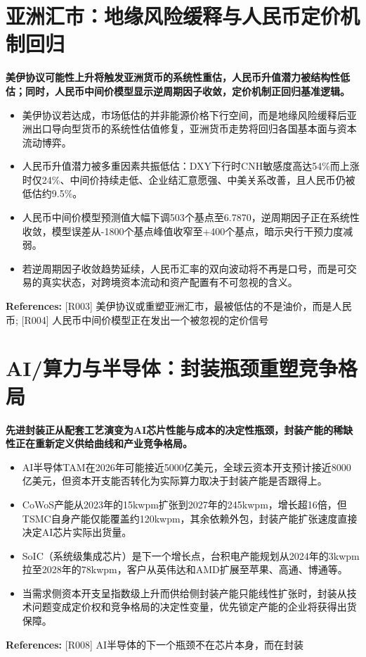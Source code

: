 \documentclass[11pt]{ctexart}
\begin{document}
\section{亚洲汇市：地缘风险缓释与人民币定价机制回归}
\textbf{美伊协议可能性上升将触发亚洲货币的系统性重估，人民币升值潜力被结构性低估；同时，人民币中间价模型显示逆周期因子收敛，定价机制正回归基准逻辑。}

\begin{itemize}
  \item 美伊协议若达成，市场低估的并非能源价格下行空间，而是地缘风险缓释后亚洲出口导向型货币的系统性估值修复，亚洲货币走势将回归各国基本面与资本流动博弈。
  \item 人民币升值潜力被多重因素共振低估：DXY下行时CNH敏感度高达54\%而上涨时仅24\%、中间价持续走低、企业结汇意愿强、中美关系改善，且人民币仍被低估约9.5\%。
  \item 人民币中间价模型预测值大幅下调503个基点至6.7870，逆周期因子正在系统性收敛，模型误差从-1800个基点峰值收窄至+400个基点，暗示央行干预力度减弱。
  \item 若逆周期因子收敛趋势延续，人民币汇率的双向波动将不再是口号，而是可交易的真实状态，对跨境资本流动和资产配置有不可忽视的含义。
\end{itemize}
{\small\color{refgray}\textbf{References:} [R003] 美伊协议或重塑亚洲汇市，最被低估的不是油价，而是人民币; [R004] 人民币中间价模型正在发出一个被忽视的定价信号}

\section{AI/算力与半导体：封装瓶颈重塑竞争格局}
\textbf{先进封装正从配套工艺演变为AI芯片性能与成本的决定性瓶颈，封装产能的稀缺性正在重新定义供给曲线和产业竞争格局。}

\begin{itemize}
  \item AI半导体TAM在2026年可能接近5000亿美元，全球云资本开支预计接近8000亿美元，但资本开支能否转化为实际算力取决于封装产能是否跟得上。
  \item CoWoS产能从2023年的15kwpm扩张到2027年的245kwpm，增长超16倍，但TSMC自身产能仅能覆盖约120kwpm，其余依赖外包，封装产能扩张速度直接决定AI芯片实际出货量。
  \item SoIC（系统级集成芯片）是下一个增长点，台积电产能规划从2024年的3kwpm拉至2028年的78kwpm，客户从英伟达和AMD扩展至苹果、高通、博通等。
  \item 当需求侧资本开支呈指数级上升而供给侧封装产能只能线性扩张时，封装从技术问题变成定价权和竞争格局的决定性变量，优先锁定产能的企业将获得出货保障。
\end{itemize}
{\small\color{refgray}\textbf{References:} [R008] AI半导体的下一个瓶颈不在芯片本身，而在封装}
\end{document}
